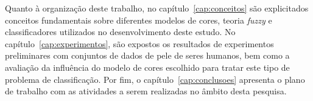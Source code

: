 Quanto à organização deste trabalho, no capítulo~\ref{cap:conceitos} são explicitados conceitos fundamentais sobre diferentes modelos de cores, teoria \emph{fuzzy} e classificadores utilizados no desenvolvimento deste estudo. No capítulo~\ref{cap:experimentos}, são expostos os resultados de experimentos preliminares com conjuntos de dados de pele de seres humanos, bem como a avaliação da influência do modelo de cores escolhido para tratar este tipo de problema de classificação. Por fim, o capítulo~\ref{cap:conclusoes} apresenta o plano de trabalho com as atividades a serem realizadas no âmbito desta pesquisa.
